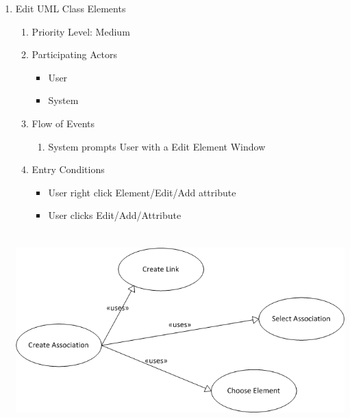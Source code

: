 \documentclass[a4paper, 12pt]{article}
\begin{document}
\begin{enumerate}
\item Edit UML Class Elements
  \begin {enumerate}
  \item Priority Level: Medium
  \item Participating Actors
    \begin {itemize}
    \item User
    \item System
    \end {itemize}
  \item Flow of Events
    \begin {enumerate}
    \item System prompts User with a Edit Element Window
    \end {enumerate}
  \item Entry Conditions
    \begin {itemize}
    \item User right click Element/Edit/Add attribute
    \item User clicks Edit/Add/Attribute
    \end {itemize}
  \end {enumerate}

  \begin {center}
    \includegraphics[height=3in, width=5in]{img/CreateAssociation.png}
  \end {center}


\end{enumerate}
\end{document}
